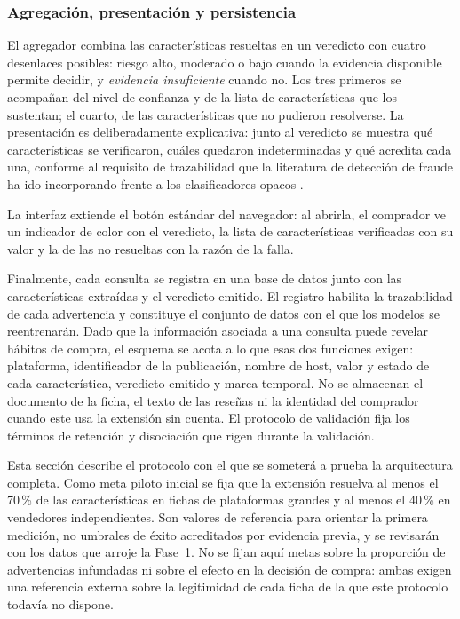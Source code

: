 \subsubsection{Agregación, presentación y persistencia}

El agregador combina las características resueltas en un veredicto con cuatro desenlaces
posibles: riesgo alto, moderado o bajo cuando la evidencia disponible permite decidir, y
\emph{evidencia insuficiente} cuando no. Los tres primeros se acompañan del nivel de confianza
y de la lista de características que los sustentan; el cuarto, de las características que no
pudieron resolverse. La presentación es deliberadamente explicativa: junto al veredicto se
muestra qué características se verificaron, cuáles quedaron indeterminadas y qué acredita cada
una, conforme al requisito de trazabilidad que la literatura de detección de fraude ha ido
incorporando frente a los clasificadores opacos \cite{ref28}.

La interfaz extiende el botón estándar del navegador: al abrirla, el comprador ve un indicador
de color con el veredicto, la lista de características verificadas con su valor y la de las no
resueltas con la razón de la falla.

Finalmente, cada consulta se registra en una base de datos junto con las características
extraídas y el veredicto emitido. El registro habilita la trazabilidad de cada advertencia y
constituye el conjunto de datos con el que los modelos se reentrenarán. Dado que la
información asociada a una consulta puede revelar hábitos de compra, el esquema se acota a lo
que esas dos funciones exigen: plataforma, identificador de la publicación, nombre de host,
valor y estado de cada característica, veredicto emitido y marca temporal. No se almacenan el
documento de la ficha, el texto de las reseñas ni la identidad del comprador cuando este usa
la extensión sin cuenta. El protocolo de validación fija los términos de retención y disociación que rigen
durante la validación.

Esta sección describe el protocolo con el que se someterá a prueba la arquitectura completa.
Como meta piloto inicial se fija que la extensión resuelva al menos el 70\,\% de las
características en fichas de plataformas grandes y al menos el 40\,\% en vendedores
independientes. Son valores de referencia para orientar la primera medición, no umbrales de
éxito acreditados por evidencia previa, y se revisarán con los datos que arroje la Fase~1. No
se fijan aquí metas sobre la proporción de advertencias infundadas ni sobre el efecto en la
decisión de compra: ambas exigen una referencia externa sobre la legitimidad de cada ficha de
la que este protocolo todavía no dispone.

